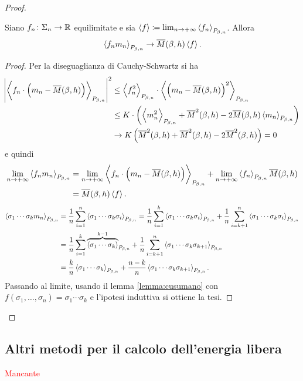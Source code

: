 \begin{proof}
\begin{pind}
    \begin{lemma}\label{lemma:cusumano}
        Siano $ f_n\colon \Sigma_n \to \mathbb{R} $ equilimitate e sia $ \left< f \right> \coloneqq \lim_{n \to +\infty}\left< f_n \right>_{P_{\beta, n}} $. Allora
        \[ \left< f_n m_n \right>_{P_{\beta,n}} \to \overline{M}(\beta,h) \left< f \right>. \]
    \end{lemma}
    \begin{proof}
        Per la diseguaglianza di Cauchy-Schwartz si ha
        \begin{align*}
            \abs{ \left< f_n\cdot \left(m_n-\overline{M}(\beta,h) \right)  \right>_{P_{\beta,n}} }^2  & \leq \left< f_n^2 \right>_{P_{\beta,n}} \cdot \left< \left (m_n-\overline{M}(\beta,h)\right )^2 \right>_{P_{\beta,n}} \\
            & \leq K \cdot \left( \left< m_n^2 \right>_{P_{\beta,n}} + \overline{M}^2(\beta,h) - 2\overline{M}(\beta,h)\left< m_n \right>_{P_{\beta,n}} \right) \\
            & \to K \left( \overline{M}^2(\beta,h) + \overline{M}^2(\beta,h) - 2\overline{M}^2(\beta,h) \right) = 0
        \end{align*}
        e quindi
        \begin{align*}
            \lim_{n \to +\infty} \left< f_n m_n \right>_{P_{\beta,n}} & = \lim_{n \to +\infty} \left< f_n\cdot \left(m_n-\overline{M}(\beta,h) \right)  \right>_{P_{\beta,n}} + \lim_{n \to +\infty}\left< f_n \right>_{P_{\beta,n}} \overline{M}(\beta,h) \\
            & = \overline{M}(\beta,h)\left< f \right>. \qedhere
        \end{align*}
        \begin{align*}
            \left< \sigma_1 \cdots \sigma_k m_n \right>_{P_{\beta,n}} & = \frac{1}{n} \sum_{i=1}^{n} \left< \sigma_1 \cdots \sigma_k \sigma_i \right>_{P_{\beta,n}} = \frac{1}{n} \sum_{i=1}^k\left< \sigma_1\cdots\sigma_k\sigma_i \right>_{P_{\beta,n}} + \frac{1}{n} \sum_{i=k+1}^n \left< \sigma_1\cdots\sigma_k\sigma_i \right>_{P_{\beta,n}} \\
            & = \frac{1}{n} \sum_{i=1}^k {\overbrace{\left< \sigma_1 \cdots \sigma_k \right>}^{k-1}}_{P_{\beta,n}} + \frac{1}{n} \sum_{i=k+1}^n \left< \sigma_1 \cdots \sigma_k \sigma_{k+1} \right>_{P_{\beta,n}} \\
            & = \frac{k}{n} \left< \sigma_1 \cdots \sigma_k \right>_{P_{\beta,n}} + \frac{n-k}{n} \left< \sigma_1 \cdots \sigma_k \sigma_{k+1} \right>_{P_{\beta,n}}.
        \end{align*}
        Passando al limite, usando il lemma \ref{lemma:cusumano} con $ f(\sigma_1, \ldots, \sigma_n) = \sigma_1 \cdots \sigma_k $ e l'ipotesi induttiva si ottiene la tesi.
    \end{proof}
\end{pind}
\end{proof}

\subsection{Altri metodi per il calcolo dell'energia libera}
\textcolor{red}{Mancante}
